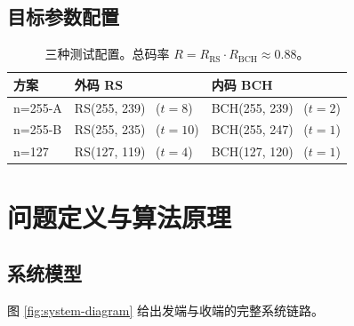 \documentclass[11pt,a4paper]{article}
\begin{document}
\subsection{目标参数配置}

\begin{table}[!ht]
\centering
\begin{tabularx}{\textwidth}{lXX}
\toprule
\textbf{方案} & \textbf{外码 RS} & \textbf{内码 BCH} \\
\midrule
n=255-A & RS(255, 239) \  ($t=8$)  & BCH(255, 239) \  ($t=2$) \\
n=255-B & RS(255, 235) \  ($t=10$) & BCH(255, 247) \  ($t=1$) \\
n=127   & RS(127, 119) \  ($t=4$)  & BCH(127, 120) \  ($t=1$) \\
\bottomrule
\end{tabularx}
\caption{三种测试配置。总码率 $R = R_{\text{RS}} \cdot R_{\text{BCH}} \approx 0.88$。}
\end{table}

\section{问题定义与算法原理}

\subsection{系统模型}

图 \ref{fig:system-diagram} 给出发端与收端的完整系统链路。
\end{document}
